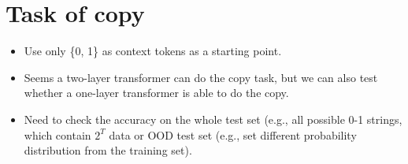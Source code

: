 \section{Task of copy}

\begin{itemize}
    \item Use only \{0, 1\} as context tokens as a starting point.
    \item Seems a two-layer transformer can do the copy task, but we can also test whether a one-layer transformer is able to do the copy.
    \item Need to check the accuracy on the whole test set (e.g., all possible 0-1 strings, which contain $2^T$ data or OOD test set (e.g., set different probability distribution from the training set).
\end{itemize}